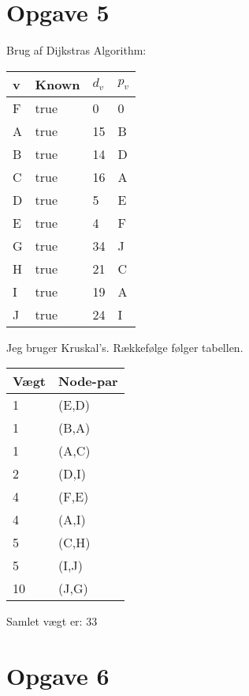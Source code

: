 \documentclass{article}
\begin{document}
\section{Opgave 5}
Brug af Dijkstras Algorithm:
\begin{table}[H]
\centering
\begin{tabular}{|l|l|l|l|}
\hline
\rowcolor[HTML]{C0C0C0} 
v  & Known & $d_v$   & $p_v$     \\ \hline
F  & true  & 0    & 0    \\ \hline
A  & true  & 15   & B    \\ \hline
B  & true  & 14   & D    \\ \hline
C  & true  & 16   & A    \\ \hline
D  & true  & 5    & E    \\ \hline
E  & true  & 4    & F    \\ \hline
G  & true  & 34   & J    \\ \hline
H  & true  & 21   & C    \\ \hline
I  & true  & 19   & A    \\ \hline
J  & true  & 24   & I    \\ \hline
\end{tabular}
\end{table}

Jeg bruger Kruskal's. Rækkefølge følger tabellen.
\begin{table}[H]
\centering
\begin{tabular}{|l|l|}
\hline
\rowcolor[HTML]{C0C0C0} 
Vægt  & Node-par \\ \hline
1       & (E,D)     \\ \hline
1       & (B,A)     \\ \hline
1       & (A,C)     \\ \hline
2       & (D,I)     \\ \hline
4       & (F,E)     \\ \hline
4       & (A,I)     \\ \hline
5       & (C,H)     \\ \hline
5       & (I,J)     \\ \hline
10      & (J,G)     \\ \hline
\end{tabular}
\end{table}

Samlet vægt er: 33

\section{Opgave 6}
\end{document}

